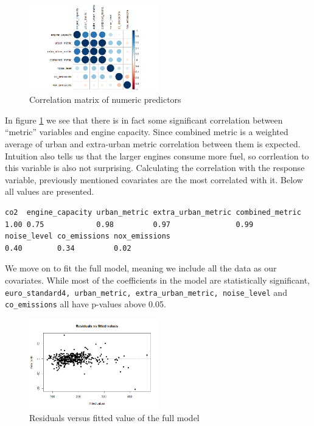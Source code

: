 \documentclass[12pt]{article}
\begin{document}
\begin{figure}[!h]
  \centering
  \includegraphics[width=0.5\textwidth]{project3/corrplot.png}
  \caption{Correlation matrix of numeric predictors}
  \label{fig:corrplot}
\end{figure}
In figure \ref{fig:corrplot} we see that there is in fact some significant correlation between ``metric'' variables and engine capacity.
Since combined metric is a weighted average of urban and extra-urban metric correlation between them is expected. Intuition also
tells us that the larger engines consume more fuel, so corrleation to this variable is also not surprising. Calculating the correlation
with the response variable, previously mentioned covariates are the most correlated with it. Below all values are presented.

\begin{verbatim}
co2  engine_capacity urban_metric extra_urban_metric combined_metric 
1.00 0.75            0.98         0.97               0.99            
noise_level co_emissions nox_emissions 
0.40        0.34         0.02
\end{verbatim}

We move on to fit the full model, meaning we include all the data as our covariates. While most of the coefficients in the model are
statistically significant, \texttt{euro\_standard4, urban\_metric, extra\_urban\_metric, noise\_level} and \texttt{co\_emissions} all have p-values above 0.05.



\begin{figure}
  \centering
  \includegraphics[width=0.5\textwidth]{project3/resVsFit_full.png}
  \caption{Residuals versus fitted value of the full model}
  \label{fig:resVsFit_full}
\end{figure}
\end{document}
